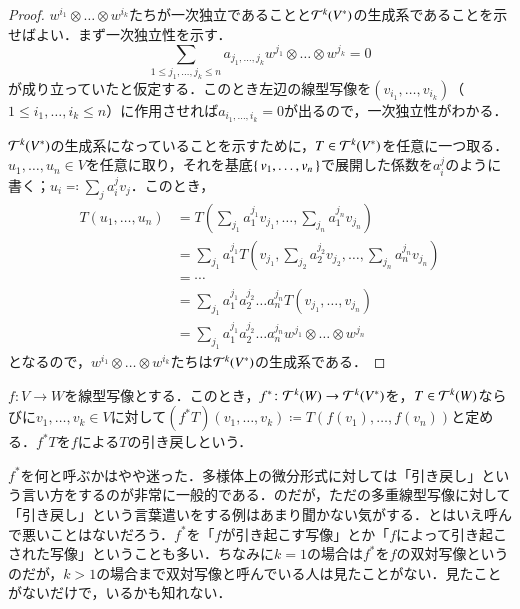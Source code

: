 \begin{proof}
$w^{i_1} \otimes \dots \otimes w^{i_k}$たちが一次独立であることと$\mathcal{T}^k(V^*)$の生成系であることを示せばよい．まず一次独立性を示す．
\begin{equation}
\sum_{1\leq j_1, \dots, j_k \leq n} a_{j_1, \dots, j_k} w^{j_1} \otimes \dots \otimes w^{j_k} = 0
\end{equation}が成り立っていたと仮定する．このとき左辺の線型写像を$(v_{i_1}, \dots, v_{i_k})$（$1 \leq i_1, \dots, i_k \leq n$）に作用させれば$a_{i_1, \dots, i_k}=0$が出るので，一次独立性がわかる．

$\mathcal{T}^k(V^*)$の生成系になっていることを示すために，$T \in \mathcal{T}^k(V^*)$を任意に一つ取る．$u_1, \dots, u_n \in V$を任意に取り，それを基底$\set{v_1, \dots, v_n}$で展開した係数を$a_i^j$のように書く；$u_i \eqqcolon \sum_{j} a_i^j v_j$．このとき，
\begin{align}
T(u_1, \dots, u_n) &= T\left( \sum_{j_1} a_1^{j_1} v_{j_1}, \dots, \sum_{j_n} a_1^{j_n} v_{j_n} \right) \\
&= \sum_{j_1} a_1^{j_1} T\left( v_{j_1},  \sum_{j_2} a_2^{j_2} v_{j_2}, \dots, \sum_{j_n} a_n^{j_n} v_{j_n} \right) \\
&= \dotsb \\
&= \sum_{j_1} a_1^{j_1} a_2^{j_2} \dots a_n^{j_n}  T\left( v_{j_1}, \dots, v_{j_n} \right) \\
&= \sum_{j_1} a_1^{j_1} a_2^{j_2} \dots a_n^{j_n}  w^{j_1} \otimes \dots \otimes w^{j_n}
\end{align}となるので，$w^{i_1} \otimes \dots \otimes w^{i_k}$たちは$\mathcal{T}^k(V^*)$の生成系である．
\end{proof}

\begin{defi}
$f \colon V \to W$を線型写像とする．このとき，$f^* \colon \mathcal{T}^k(W) \to \mathcal{T}^k(V^*)$を，$T \in \mathcal{T}^k(W)$ならびに$v_1, \dots, v_k \in V$に対して$(f^*T) (v_1, \dots, v_k) \coloneqq T(f(v_1), \dots, f(v_n))$と定める．$f^*T$を$f$による$T$の引き戻しという．
\end{defi}

\begin{dig}
$f^*$を何と呼ぶかはやや迷った．多様体上の微分形式に対しては「引き戻し」という言い方をするのが非常に一般的である．のだが，ただの多重線型写像に対して「引き戻し」という言葉遣いをする例はあまり聞かない気がする．とはいえ呼んで悪いことはないだろう．$f^*$を「$f$が引き起こす写像」とか「$f$によって引き起こされた写像」ということも多い．ちなみに$k=1$の場合は$f^*$を$f$の双対写像というのだが，$k > 1$の場合まで双対写像と呼んでいる人は見たことがない．見たことがないだけで，いるかも知れない．
\end{dig}



